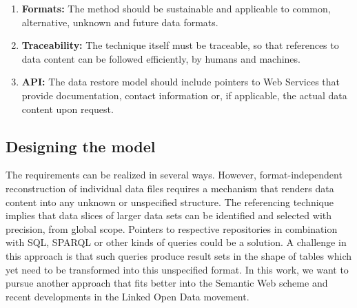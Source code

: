 \documentclass{acm_proc_article-sp}
\begin{document}
\begin{enumerate}
  \item \textbf{Formats:} The method should be sustainable and applicable to common, alternative, unknown and future data formats.

  \item \textbf{Traceability:} The technique itself must be traceable, so that references to data content can be followed efficiently, by humans and machines.
 

  \item \textbf{API:} The data restore model should include pointers to Web Services that provide documentation, contact information or, if applicable, the actual data content upon request.

\end{enumerate}




\subsection{Designing the model}


The requirements can be realized in several ways.
However, format-independent reconstruction of individual data files requires a mechanism that renders data content into any unknown or unspecified structure.
The referencing technique implies that data slices of larger data sets can be identified and selected with precision, from global scope.
Pointers to respective repositories in combination with SQL, SPARQL or other kinds of queries could be a solution.
A challenge in this approach is that such queries produce result sets in the shape of tables which yet need to be transformed into this unspecified format.
In this work, we want to pursue another approach that fits better into the Semantic Web scheme and recent developments in the Linked Open Data movement.
\end{document}
